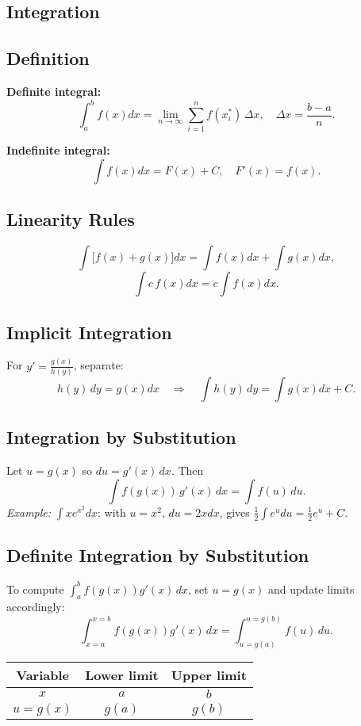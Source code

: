 \documentclass{article}
\begin{document}
\begin{multicols}{2}
\section*{Integration}

\subsection*{Definition}
\textbf{Definite integral:}
\[
\int_a^b f(x)dx=\lim_{n\to\infty}\sum_{i=1}^n f(x_i^*)\,\Delta x,
\quad \Delta x=\frac{b-a}{n}.
\]

\textbf{Indefinite integral:}
\[
\int f(x)dx=F(x)+C,
\quad F'(x)=f(x).
\]

\subsection*{Linearity Rules}
\[
\int\bigl[f(x)+g(x)\bigr]dx=\int f(x)dx+\int g(x)dx,
\]
\[
\int c\,f(x)dx=c\int f(x)dx.
\]

\subsection*{Implicit Integration}
For $y'=\frac{g(x)}{h(y)}$, separate:
\[
h(y)\,dy=g(x)dx\quad\Longrightarrow\quad
\int h(y)\,dy=\int g(x)dx + C.
\]

\subsection*{Integration by Substitution}
Let $u=g(x)$ so $du=g'(x)\,dx$. Then
\[
\int f(g(x))\,g'(x)\,dx=\int f(u)\,du.
\]
\emph{Example:} $\int x e^{x^2}dx$: with $u=x^2$, $du=2x dx$, gives $\tfrac12\int e^u du=\tfrac12 e^u + C$.

\subsection*{Definite Integration by Substitution}
To compute $\int_a^b f(g(x))g'(x)\,dx$, set $u=g(x)$ and update limits accordingly:
\[
\int_{x=a}^{x=b} f(g(x))g'(x)\,dx = \int_{u=g(a)}^{u=g(b)} f(u)\,du.
\]

\begin{center}
\begin{tabular}{c|cc}
Variable & Lower limit & Upper limit \\
\hline
$x$ & $a$ & $b$ \\
$u=g(x)$ & $g(a)$ & $g(b)$
\end{tabular}
\end{center}


\end{multicols}
\end{document}
